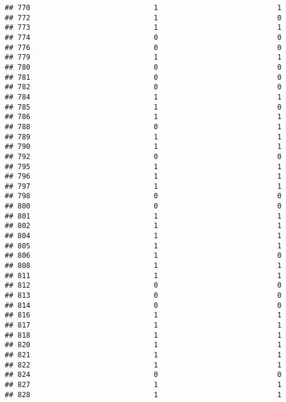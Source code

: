 \documentclass[
]{article}
\begin{document}
\begin{verbatim}
## 770                             1                            1
## 772                             1                            0
## 773                             1                            1
## 774                             0                            0
## 776                             0                            0
## 779                             1                            1
## 780                             0                            0
## 781                             0                            0
## 782                             0                            0
## 784                             1                            1
## 785                             1                            0
## 786                             1                            1
## 788                             0                            1
## 789                             1                            1
## 790                             1                            1
## 792                             0                            0
## 795                             1                            1
## 796                             1                            1
## 797                             1                            1
## 798                             0                            0
## 800                             0                            0
## 801                             1                            1
## 802                             1                            1
## 804                             1                            1
## 805                             1                            1
## 806                             1                            0
## 808                             1                            1
## 811                             1                            1
## 812                             0                            0
## 813                             0                            0
## 814                             0                            0
## 816                             1                            1
## 817                             1                            1
## 818                             1                            1
## 820                             1                            1
## 821                             1                            1
## 822                             1                            1
## 824                             0                            0
## 827                             1                            1
## 828                             1                            1

\end{verbatim}
\end{document}
